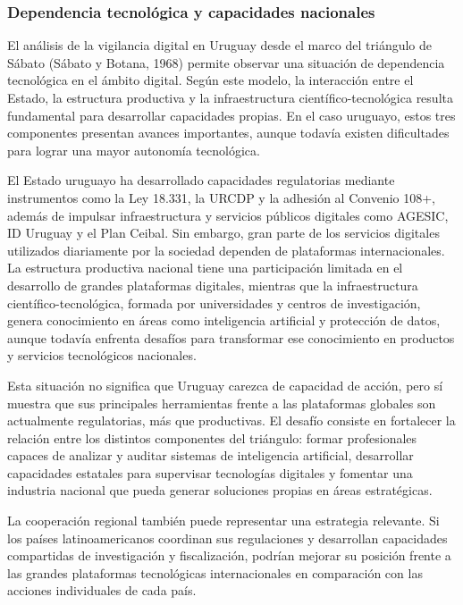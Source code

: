 \documentclass[11pt,a4paper]{article}
\begin{document}
\subsubsection{Dependencia tecnológica y capacidades nacionales}

El análisis de la vigilancia digital en Uruguay desde el marco del triángulo de Sábato (Sábato y Botana, 1968) permite observar una situación de dependencia tecnológica en el ámbito digital. Según este modelo, la interacción entre el Estado, la estructura productiva y la infraestructura científico-tecnológica resulta fundamental para desarrollar capacidades propias. En el caso uruguayo, estos tres componentes presentan avances importantes, aunque todavía existen dificultades para lograr una mayor autonomía tecnológica.

El Estado uruguayo ha desarrollado capacidades regulatorias mediante instrumentos como la Ley 18.331, la URCDP y la adhesión al Convenio 108+, además de impulsar infraestructura y servicios públicos digitales como AGESIC, ID Uruguay y el Plan Ceibal. Sin embargo, gran parte de los servicios digitales utilizados diariamente por la sociedad dependen de plataformas internacionales. La estructura productiva nacional tiene una participación limitada en el desarrollo de grandes plataformas digitales, mientras que la infraestructura científico-tecnológica, formada por universidades y centros de investigación, genera conocimiento en áreas como inteligencia artificial y protección de datos, aunque todavía enfrenta desafíos para transformar ese conocimiento en productos y servicios tecnológicos nacionales.

Esta situación no significa que Uruguay carezca de capacidad de acción, pero sí muestra que sus principales herramientas frente a las plataformas globales son actualmente regulatorias, más que productivas. El desafío consiste en fortalecer la relación entre los distintos componentes del triángulo: formar profesionales capaces de analizar y auditar sistemas de inteligencia artificial, desarrollar capacidades estatales para supervisar tecnologías digitales y fomentar una industria nacional que pueda generar soluciones propias en áreas estratégicas.

La cooperación regional también puede representar una estrategia relevante. Si los países latinoamericanos coordinan sus regulaciones y desarrollan capacidades compartidas de investigación y fiscalización, podrían mejorar su posición frente a las grandes plataformas tecnológicas internacionales en comparación con las acciones individuales de cada país.
\end{document}
